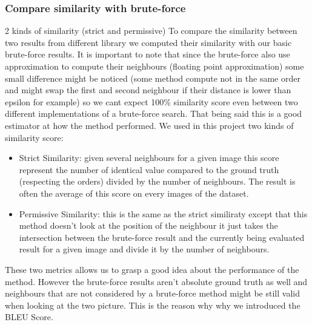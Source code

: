 \documentclass[a4paper]{article}
\begin{document}
	\subsubsection{Compare similarity with brute-force}
		2 kinds of similarity (strict and permissive)
		To compare the similarity between two results from different library we computed their similarity with our basic brute-force results. It is important to note that since the brute-force also use approximation to compute their neighbours (floating point approximation) some small difference might be noticed (some method compute not in the same order and might swap the first and second neighbour if their distance is lower than epsilon for example) so we cant expect 100\% similarity score even between two different implementations of a brute-force search. That being said this is a good estimator at how the method performed. We used in this project two kinds of similarity score:
		\begin{itemize}
			\item Strict Similarity: given several neighbours for a given image this score represent the number of identical value compared to the ground truth (respecting the orders) divided by the number of neighbours. The result is often the average of this score on every images of the dataset.
			\item Permissive Similarity: this is the same as the strict similiraty except that this method doesn't look at the position of the neighbour it just takes the intersection between the brute-force result and the currently being evaluated result for a given image and divide it by the number of neighbours.
		\end{itemize}
		These two metrics allows us to grasp a good idea about the performance of the method. However the brute-force results aren't absolute ground truth as well and neighbours that are not considered by a brute-force method might be still valid when looking at the two picture. This is the reason why why we introduced the BLEU Score.
\end{document}

